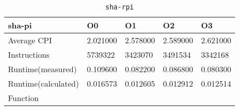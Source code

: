 \begin{table}[ht!]
\centering
\caption{\texttt{sha-rpi}}
\label{tab:sha-rpi}
\begin{tabular}{|l|l|l|l|l|}
\hline
\textbf{sha-pi}	&	\textbf{O0}	&	\textbf{O1}	&	\textbf{O2}	&	\textbf{O3}	\\\hline\hline
Average CPI	&	2.021000	&	2.578000	&	2.589000	&	2.621000	\\\hline
Instructions	&	5739322	&	3423070	&	3491534	&	3342168	\\\hline
Runtime(measured)	&	0.109600	&	0.082200	&	0.086800	&	0.080300	\\\hline
Runtime(calculated)	&	0.016573	&	0.012605	&	0.012912	&	0.012514	\\\hline
Function	&		&		&		&		\\\hline
\end{tabular}
\end{table}
